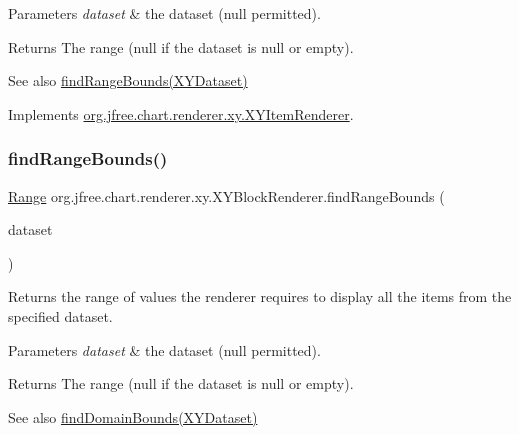 \begin{DoxyParams}{Parameters}
{\em dataset} & the dataset ({\ttfamily null} permitted).\\
\hline
\end{DoxyParams}
\begin{DoxyReturn}{Returns}
The range ({\ttfamily null} if the dataset is {\ttfamily null} or empty).
\end{DoxyReturn}
\begin{DoxySeeAlso}{See also}
\mbox{\hyperlink{classorg_1_1jfree_1_1chart_1_1renderer_1_1xy_1_1_x_y_block_renderer_a5f3e45b813ff5e80bf488166c02cf26f}{find\+Range\+Bounds(\+X\+Y\+Dataset)}} 
\end{DoxySeeAlso}


Implements \mbox{\hyperlink{interfaceorg_1_1jfree_1_1chart_1_1renderer_1_1xy_1_1_x_y_item_renderer_a77925018c73214f58daac73147ba5e52}{org.\+jfree.\+chart.\+renderer.\+xy.\+X\+Y\+Item\+Renderer}}.

\mbox{\label{classorg_1_1jfree_1_1chart_1_1renderer_1_1xy_1_1_x_y_block_renderer_a5f3e45b813ff5e80bf488166c02cf26f}} 
\subsubsection{\texorpdfstring{find\+Range\+Bounds()}{findRangeBounds()}}
{\footnotesize\ttfamily \mbox{\hyperlink{classorg_1_1jfree_1_1data_1_1_range}{Range}} org.\+jfree.\+chart.\+renderer.\+xy.\+X\+Y\+Block\+Renderer.\+find\+Range\+Bounds (\begin{DoxyParamCaption}\item[{\mbox{\hyperlink{interfaceorg_1_1jfree_1_1data_1_1xy_1_1_x_y_dataset}{X\+Y\+Dataset}}}]{dataset }\end{DoxyParamCaption})}

Returns the range of values the renderer requires to display all the items from the specified dataset.


\begin{DoxyParams}{Parameters}
{\em dataset} & the dataset ({\ttfamily null} permitted).\\
\hline
\end{DoxyParams}
\begin{DoxyReturn}{Returns}
The range ({\ttfamily null} if the dataset is {\ttfamily null} or empty).
\end{DoxyReturn}
\begin{DoxySeeAlso}{See also}
\mbox{\hyperlink{classorg_1_1jfree_1_1chart_1_1renderer_1_1xy_1_1_x_y_block_renderer_a06dee596697cffdf1e23acb81a2ecd5e}{find\+Domain\+Bounds(\+X\+Y\+Dataset)}} 
\end{DoxySeeAlso}


